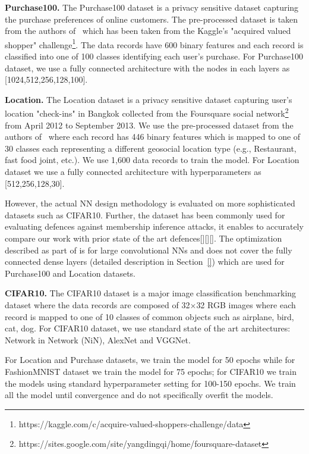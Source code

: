 \noindent\textbf{Purchase100.} The  Purchase100  dataset  is a privacy sensitive dataset capturing the purchase preferences of online customers.
The pre-processed dataset is taken from the authors of~\cite{} which has been taken from the Kaggle's "acquired valued shopper" challenge\footnote{https://kaggle.com/c/acquire-valued-shoppers-challenge/data}.
The data records have 600 binary features and each record is classified into one of 100 classes identifying each user's purchase.
For Purchase100 dataset, we use a fully connected architecture with the nodes in each layers as [1024,512,256,128,100].

\noindent\textbf{Location.} The Location dataset is a privacy sensitive dataset capturing user's location "check-ins" in Bangkok collected from the Foursquare social network\footnote{https://sites.google.com/site/yangdingqi/home/foursquare-dataset} from April 2012 to September 2013.
We use the pre-processed dataset from the authors of~\cite{} where each record has 446 binary features which is mapped to one of 30 classes each representing a different geosocial location type (e.g., Restaurant, fast food joint, etc.). We use 1,600 data records to train the model.
For Location dataset we use a fully connected architecture with hyperparameters as [512,256,128,30].

However, the actual \method\hspace{0.02in} NN design methodology is evaluated on more sophisticated datasets such as CIFAR10.
Further, the dataset has been commonly used for evaluating defences against membership inference attacks, it enables to accurately compare our work with prior state of the art defences[][][].
The optimization described as part of \method\hspace{0.02in} is for large convolutional NNs and does not cover the fully connected dense layers (detailed description in Section~\ref{}) which are used for Purchase100 and Location datasets.

\noindent\textbf{CIFAR10.} The CIFAR10 dataset is a major image classification benchmarking dataset where the data records are composed of 32$\times$32 RGB images where each record is mapped to one of 10 classes of common objects such as airplane, bird, cat, dog.
For CIFAR10 dataset, we use standard state of the art architectures: Network in Network (NiN), AlexNet and VGGNet.

For Location and Purchase datasets, we train the model for 50 epochs while for FashionMNIST dataset we train the model for 75 epochs; for CIFAR10 we train the models using standard hyperparameter setting for 100-150 epochs.
We train all the model until convergence and do not specifically overfit the models.


